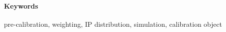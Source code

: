 \documentclass[a4paper, twocolumn, oneside]{article}
\title{\mytitle}
\author{John-John Markstedt}
\begin{document}
    \onecolumn
    \maketitle
    

    \vspace{-.1cm}

    \paragraph{Keywords}
    pre-calibration, weighting, IP distribution, simulation, calibration object

    \vspace{-.4cm}

    \newpage

    \setcounter{secnumdepth}{2}
    \setcounter{tocdepth}{2}
    \tableofcontents
    \thispagestyle{empty}
    \newpage
    \setcounter{page}{1}
    \setcounter{section}{0}

    \twocolumn

    

    \clearpage

    
    

\end{document}
